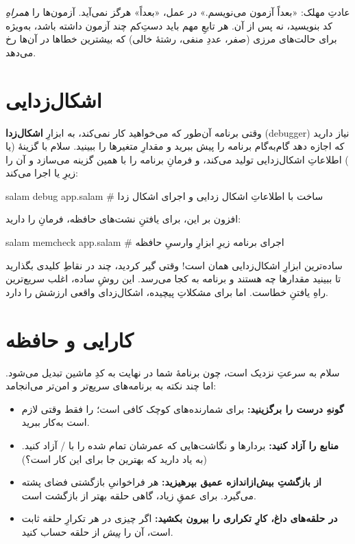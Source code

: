 \begin{warn}
عادتِ مهلک: «بعداً آزمون می‌نویسم.» در عمل، «بعداً» هرگز نمی‌آید. آزمون‌ها را
\emph{همراهِ} کد بنویسید، نه پس از آن. هر تابعِ مهم باید دستِ‌کم چند آزمون
داشته باشد، به‌ویژه برای حالت‌های مرزی (صفر، عددِ منفی، رشتهٔ خالی) که
بیشترین خطاها در آن‌ها رخ می‌دهد.
\end{warn}

\section{اشکال‌زدایی}

وقتی برنامه آن‌طور که می‌خواهید کار نمی‌کند، به ابزارِ \textbf{اشکال‌زدا}
(debugger) نیاز دارید که اجازه دهد گام‌به‌گام برنامه را پیش ببرید و مقدارِ
متغیرها را ببینید. سلام با گزینهٔ  (یا ) اطلاعاتِ
اشکال‌زدایی تولید می‌کند، و فرمانِ  برنامه را با همین گزینه می‌سازد
و آن را زیرِ  یا  اجرا می‌کند:

\begin{salamen}[language={}]
salam debug app.salam      # ساخت با اطلاعاتِ اشکال زدایی و اجرای اشکال زدا
\end{salamen}

افزون بر این، برای یافتنِ نشت‌های حافظه، فرمانِ  را دارید:

\begin{salamen}[language={}]
salam memcheck app.salam   # اجرای برنامه زیرِ ابزارِ وارسیِ حافظه
\end{salamen}

\begin{tip}
ساده‌ترین ابزارِ اشکال‌زدایی همان  است! وقتی گیر کردید، چند
 در نقاطِ کلیدی بگذارید تا ببینید مقدارها چه هستند و برنامه به کجا
می‌رسد. این روشِ ساده، اغلب سریع‌ترین راهِ یافتنِ خطاست. اما برای مشکلاتِ
پیچیده، اشکال‌زدای واقعی ارزشش را دارد.
\end{tip}

\section{کارایی و حافظه}

سلام به سرعتِ  نزدیک است، چون برنامهٔ شما در نهایت به کدِ ماشین تبدیل
می‌شود. اما چند نکته به برنامه‌های سریع‌تر و امن‌تر می‌انجامد:

\begin{itemize}
  \item \textbf{گونهِ درست را برگزینید:} برای شمارنده‌های کوچک 
        کافی است؛  را فقط وقتی لازم است به‌کار ببرید.
  \item \textbf{منابع را آزاد کنید:} بردارها و نگاشت‌هایی که عمرشان تمام شده را
        با / آزاد کنید. (به یاد دارید که
         بهترین جا برای این کار است؟)
  \item \textbf{از بازگشتِ بیش‌از‌اندازه عمیق بپرهیزید:} هر فراخوانیِ بازگشتی
        فضای پشته می‌گیرد. برای عمقِ زیاد، گاهی حلقه بهتر از بازگشت است.
  \item \textbf{در حلقه‌های داغ، کارِ تکراری را بیرون بکشید:} اگر چیزی در هر
        تکرارِ حلقه ثابت است، آن را \emph{پیش} از حلقه حساب کنید.
\end{itemize}

